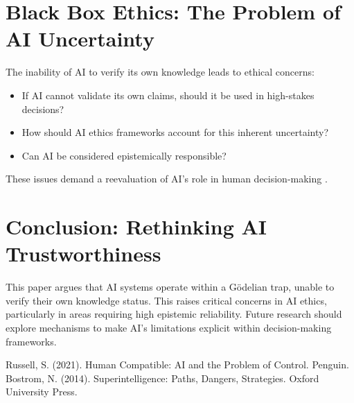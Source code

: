 \documentclass{article}
\begin{document}
	\section{Black Box Ethics: The Problem of AI Uncertainty}  
	The inability of AI to verify its own knowledge leads to ethical concerns:  
	\begin{itemize}  
		\item If AI cannot validate its own claims, should it be used in high-stakes decisions?  
		\item How should AI ethics frameworks account for this inherent uncertainty?  
		\item Can AI be considered epistemically responsible?  
	\end{itemize}  
	These issues demand a reevaluation of AI's role in human decision-making \cite{bostrom2014superintelligence}.  
	
	\section{Conclusion: Rethinking AI Trustworthiness}  
	This paper argues that AI systems operate within a Gödelian trap, unable to verify their own knowledge status. This raises critical concerns in AI ethics, particularly in areas requiring high epistemic reliability. Future research should explore mechanisms to make AI's limitations explicit within decision-making frameworks.  
	
\begin{thebibliography}{9}
	 Russell, S. (2021). Human Compatible: AI and the Problem of Control. Penguin.
	 Bostrom, N. (2014). Superintelligence: Paths, Dangers, Strategies. Oxford University Press.
\end{thebibliography}

	
\end{document}
